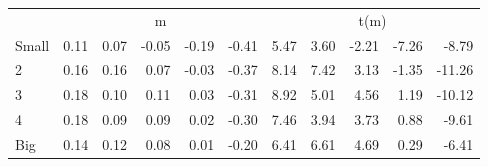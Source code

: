 \begin{table}[!ht]
\begin{tabular}{lrrrrrrrrrr}
      & \multicolumn{5}{c}{m} & \multicolumn{5}{c}{t(m)}
    
    \\
      \cmidrule(r){2-6} \cmidrule(r){7-11}

    Small   & 0.11  & 0.07  & -0.05  & -0.19  & -0.41  & 5.47  & 3.60  & -2.21  & -7.26  & -8.79  \\
         2  & 0.16  & 0.16  & 0.07  & -0.03  & -0.37  & 8.14  & 7.42  & 3.13  & -1.35  & -11.26  \\
         3  & 0.18  & 0.10  & 0.11  & 0.03  & -0.31  & 8.92  & 5.01  & 4.56  & 1.19  & -10.12  \\
         4  & 0.18  & 0.09  & 0.09  & 0.02  & -0.30  & 7.46  & 3.94  & 3.73  & 0.88  & -9.61  \\
    Big     & 0.14  & 0.12  & 0.08  & 0.01  & -0.20  & 6.41  & 6.61  & 4.69  & 0.29  & -6.41  \\

  

  \bottomrule
\end{tabular}
\label{tbl:25_Size_Var_C1997b}
\end{table}